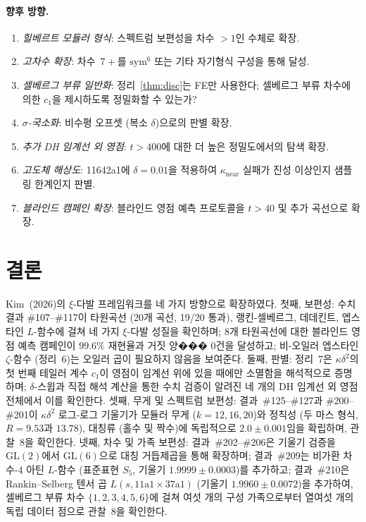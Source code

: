 \documentclass[11pt, a4paper]{article}
\theoremstyle{plain}
\theoremstyle{definition}
\begin{document}
\paragraph{향후 방향.}
\begin{enumerate}
  \item \textit{힐베르트 모듈러 형식}: 스펙트럼 보편성을 차수 $>1$인 수체로 확장.
  \item \textit{고차수 확장}: 차수~$7+$를 $\mathrm{sym}^{6}$ 또는 기타
        자기형식 구성을 통해 달성.
  \item \textit{셀베르그 부류 일반화}: 정리~\ref{thm:disc}는
        FE만 사용한다; 셀베르그 부류 차수에 의한 $c_{1}$을
        제시하도록 정밀화할 수 있는가?
  \item \textit{$\sigma$-국소화}: 비수평 오프셋
        (복소 $\delta$)으로의 판별 확장.
  \item \textit{추가 DH 임계선 외 영점}: $t>400$에 대한
        더 높은 정밀도에서의 탐색 확장.
  \item \textit{고도체 해상도}: 11642a1에 $\delta=0.01$을 적용하여
        $\kappa_{\mathrm{near}}$ 실패가 진성 이상인지
        샘플링 한계인지 판별.
  \item \textit{블라인드 캠페인 확장}: 블라인드 영점 예측 프로토콜을
        $t>40$ 및 추가 곡선으로 확장.
\end{enumerate}


\section{결론}
\label{sec:conclusion}

Kim~(2026)의 $\xi$-다발 프레임워크를 네 가지 방향으로 확장하였다.
첫째, 보편성: 수치 결과 \#107--\#117이
타원곡선 (20개 곡선, 19/20 통과), 랭킨-셀베르그, 데데킨트, 엡스타인
$L$-함수에 걸쳐 네 가지 $\xi$-다발 성질을 확인하며;
8개 타원곡선에 대한 블라인드 영점 예측 캠페인이
$99.6\%$ 재현율과 거짓 양��� 0건을 달성하고;
비-오일러 엡스타인 $\zeta$-함수 (정리~6)는
오일러 곱이 필요하지 않음을 보여준다.
둘째, 판별: 정리~7은 $\kappa\delta^{2}$의 첫 번째 테일러 계수
$c_{1}$이 영점이 임계선 위에 있을 때에만 소멸함을 해석적으로 증명하며;
$\delta$-스윕과 직접 해석 계산을 통한 수치 검증이
알려진 네 개의 DH 임계선 외 영점 전체에서 이를 확인한다.
셋째, 무게 및 스펙트럼 보편성: 결과~\#125--\#127과 \#200--\#201이
$\kappa\delta^{2}$ 로그-로그 기울기가 모듈러 무게 ($k=12,16,20$)와
정칙성 (두 마스 형식, $R=9.53$과 $13.78$), 대칭류 (홀수 및 짝수)에
독립적으로 $2.0\pm 0.001$임을 확립하며, 관찰~8을 확인한다.
넷째, 차수 및 가족 보편성: 결과~\#202--\#206은 기울기 검증을
$\mathrm{GL}(2)$에서 $\mathrm{GL}(6)$으로 대칭 거듭제곱을 통해 확장하며;
결과~\#209는 비가환 차수-4 아틴 $L$-함수
(표준표현 $S_5$, 기울기 $1.9999\pm 0.0003$)를 추가하고;
결과~\#210은 Rankin--Selberg 텐서 곱
$L(s,\text{11a1}\times\text{37a1})$ (기울기 $1.9960\pm 0.0072$)을 추가하여,
셀베르그 부류 차수 $\{1,2,3,4,5,6\}$에 걸쳐
여섯 개의 구성 가족으로부터 열여섯 개의 독립 데이터 점으로
관찰~8을 확인한다.
\end{document}
